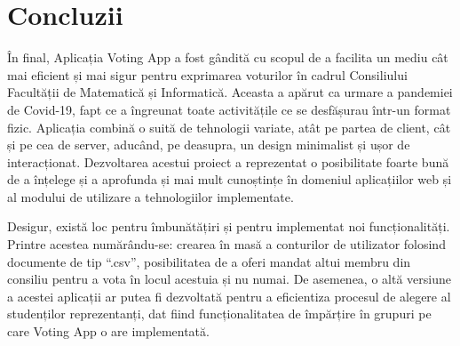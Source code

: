\chapter{Concluzii}

În final, Aplicația Voting App a fost gândită cu scopul de a facilita un mediu cât mai eficient și mai sigur pentru exprimarea voturilor în cadrul Consiliului Facultății de Matematică și Informatică. Aceasta a apărut ca urmare a pandemiei de Covid-19, fapt ce a îngreunat toate activitățile ce se desfășurau într-un format fizic. Aplicația combină o suită de tehnologii variate, atât pe partea de client, cât și pe cea de server, aducând, pe deasupra, un design minimalist și ușor de interacționat. Dezvoltarea acestui proiect a reprezentat o posibilitate foarte bună de a înțelege și a aprofunda și mai mult cunoștințe în domeniul aplicațiilor web și al modului de utilizare a tehnologiilor implementate.

Desigur, există loc pentru îmbunătățiri și pentru implementat noi funcționalități. Printre acestea numărându-se: crearea în masă a conturilor de utilizator folosind documente de tip \enquote{.csv}, posibilitatea de a oferi mandat altui membru din consiliu pentru a vota în locul acestuia și nu numai. De asemenea, o altă versiune a acestei aplicații ar putea fi dezvoltată pentru a eficientiza procesul de alegere al studenților reprezentanți, dat fiind funcționalitatea de împărțire în grupuri pe care Voting App o are implementată.